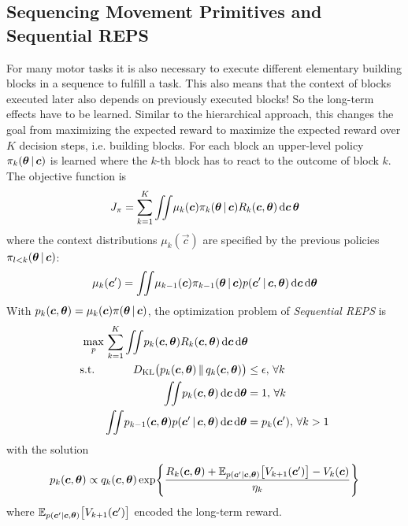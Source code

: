 		\subsection{Sequencing Movement Primitives and Sequential REPS}
			For many motor tasks it is also necessary to execute different elementary building blocks in a sequence to fulfill a task. This also means that the context of blocks executed later also depends on previously executed blocks! So the long-term effects have to be learned. Similar to the hierarchical approach, this changes the goal from maximizing the expected reward to maximize the expected reward over \(K\) decision steps, i.e. building blocks. For each block an upper-level policy \( \pi_k(\bm{\theta} \,\vert\, \bm{c}) \) is learned where the \(k\)-th block has to react to the outcome of block \(k\). The objective function is
			\begin{equation*}
				J_\pi = \sum_{k = 1}^{K} \iint\! \mu_k(\bm{c}) \pi_k(\bm{\theta} \,\vert\, \bm{c}) R_k(\bm{c}, \bm{\theta}) \dd{\bm{c}} \bm{\theta}
			\end{equation*}
			where the context distributions \( \mu_k(\vec{c}) \) are specified by the previous policies \( \pi_{l < k}(\bm{\theta} \,\vert\, \bm{c}) \):
			\begin{equation*}
				\mu_k(\bm{c}') = \iint\! \mu_{k - 1}(\bm{c}) \pi_{k - 1}(\bm{\theta} \,\vert\, \bm{c}) p(\bm{c}' \,\vert\, \bm{c}, \bm{\theta}) \dd{\bm{c}} \dd{\bm{\theta}}
			\end{equation*}
			With \( p_k(\bm{c}, \bm{\theta}) = \mu_k(\bm{c}) \pi(\bm{\theta} \,\vert\, \bm{c}) \), the optimization problem of \emph{Sequential REPS} is
			\begin{equation*}
				\begin{aligned}
					\max_p \,           & \sum_{k = 1}^{K} \iint\! p_k(\bm{c}, \bm{\theta}) R_k(\bm{c}, \bm{\theta}) \dd{\bm{c}} \dd{\bm{\theta}} \\
					\mathrm{s.t.} \quad &
					\begin{aligned}[t]
						D_\mathrm{KL}\big( p_k(\bm{c}, \bm{\theta}) \,\Vert\, q_k(\bm{c}, \bm{\theta}) \big)                         & \leq \epsilon,\, \forall k       \\
						\iint\! p_k(\bm{c}, \bm{\theta}) \dd{\bm{c}} \dd{\bm{\theta}}                                                & = 1,\, \forall k                 \\
						\iint\! p_{k - 1}(\bm{c}, \bm{\theta}) p(\bm{c}' \,\vert\, \bm{c}, \bm{\theta}) \dd{\bm{c}} \dd{\bm{\theta}} & = p_k(\bm{c}'),\, \forall k > 1
					\end{aligned}
				\end{aligned}
			\end{equation*}
			with the solution
			\begin{equation*}
				p_k(\bm{c}, \bm{\theta}) \propto q_k(\bm{c}, \bm{\theta}) \exp{ \frac{R_k(\bm{c}, \bm{\theta}) + \mathbb{E}_{p(\bm{c}' \vert\bm{c}, \bm{\theta})}\big[ V_{k + 1}(\bm{c}') \big] - V_k(\bm{c})}{\eta_k} }
			\end{equation*}
			where \( \mathbb{E}_{p(\bm{c}' \vert \bm{c}, \bm{\theta})}\big[ V_{k + 1}(\bm{c}') \big] \) encoded the long-term reward.


